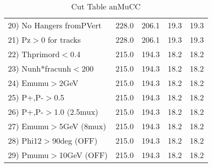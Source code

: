 \begin{table}[h!]
\begin{tabular}{||l||r|r|r|r||}
 20) No Hangers fromPVert &       228.0 &       206.1 &        19.3 &        19.3 \\
 21) Pz$>$0 for tracks    &       228.0 &       206.1 &        19.3 &        19.3 \\
 22) Thprimord$<$0.4      &       215.0 &       194.3 &        18.2 &        18.2 \\
 23) Nunh*fracunh$<$200   &       215.0 &       194.3 &        18.2 &        18.2 \\
 24) Emumu$>$2GeV         &       215.0 &       194.3 &        18.2 &        18.2 \\
 25) P+,P-$>$0.5          &       215.0 &       194.3 &        18.2 &        18.2 \\
 26) P+,P-$>$1.0 (2.5mux) &       215.0 &       194.3 &        18.2 &        18.2 \\
 27) Emumu$>$5GeV  (8mux) &       215.0 &       194.3 &        18.2 &        18.2 \\
 28) Phi12$>$90deg  (OFF) &       215.0 &       194.3 &        18.2 &        18.2 \\
 29) Pmumu$>$10GeV  (OFF) &       215.0 &       194.3 &        18.2 &        18.2 \\
 \hline
 \hline
 \end{tabular}
 \caption{Cut Table  anMuCC }
 \label{tab-cut_anmcc}
 \end{table}
